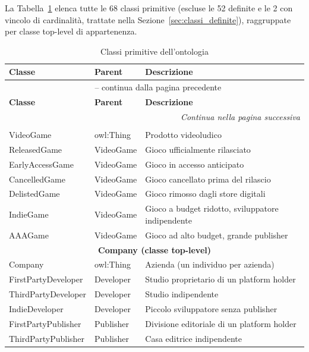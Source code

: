 La Tabella~\ref{tab:classi} elenca tutte le 68 classi primitive (escluse le 52
definite e le 2 con vincolo di cardinalit\`a, trattate nella Sezione~\ref{sec:classi_definite}), raggruppate per
classe top-level di appartenenza.

\begin{longtable}{llp{5cm}}
\caption{Classi primitive dell'ontologia}\label{tab:classi}\\
\toprule
\textbf{Classe} & \textbf{Parent} & \textbf{Descrizione} \\
\midrule
\endfirsthead
\multicolumn{3}{c}{\tablename\ \thetable{} -- continua dalla pagina precedente} \\
\toprule
\textbf{Classe} & \textbf{Parent} & \textbf{Descrizione} \\
\midrule
\endhead
\bottomrule
\multicolumn{3}{r}{\textit{Continua nella pagina successiva}} \\
\endfoot
\bottomrule
\endlastfoot

\multicolumn{3}{c}{\textbf{VideoGame (classe top-level)}} \\
\midrule
VideoGame           & owl:Thing       & Prodotto videoludico \\
ReleasedGame        & VideoGame       & Gioco ufficialmente rilasciato \\
EarlyAccessGame     & VideoGame       & Gioco in accesso anticipato \\
CancelledGame       & VideoGame       & Gioco cancellato prima del rilascio \\
DelistedGame        & VideoGame       & Gioco rimosso dagli store digitali \\
IndieGame           & VideoGame       & Gioco a budget ridotto, sviluppatore indipendente \\
AAAGame             & VideoGame       & Gioco ad alto budget, grande publisher \\
\midrule

\multicolumn{3}{c}{\textbf{Company (classe top-level)}} \\
\midrule
Company             & owl:Thing       & Azienda (un individuo per azienda) \\
FirstPartyDeveloper & Developer       & Studio proprietario di un platform holder \\
ThirdPartyDeveloper & Developer       & Studio indipendente \\
IndieDeveloper      & Developer       & Piccolo sviluppatore senza publisher \\
FirstPartyPublisher & Publisher       & Divisione editoriale di un platform holder \\
ThirdPartyPublisher & Publisher       & Casa editrice indipendente \\
\midrule


\end{longtable}
